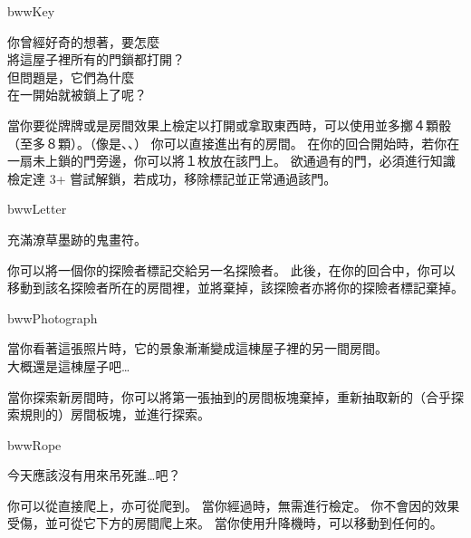 \begin{OmenCard}{bww}{Key}{}
	\begin{CardStory}
		你曾經好奇的想著，要怎麼\\
		將這屋子裡所有的門鎖都打開？\\
		但問題是，它們為什麼\\
		在一開始就被鎖上了呢？
	\end{CardStory}
	\footnotesize
	當你要從牌牌或是房間效果上檢定以打開或拿取東西時，可以使用\ThisName{}並多擲４顆骰（至多８顆）。（像是、、）\smallbreak
	你可以直接進出有的房間。\smallbreak
	在你的回合開始時，若你在一扇未上鎖的門旁邊，你可以將１枚放在該門上。\smallbreak
	欲通過有的門，必須進行知識檢定達 3+ 嘗試解鎖，若成功，移除標記並正常通過該門。
\end{OmenCard}%
\linebreak[0]%
\begin{OmenCard}{bww}{Letter}{}
	\begin{CardStory}
		充滿潦草墨跡的鬼畫符。
	\end{CardStory}
	你可以將一個你的探險者標記交給另一名探險者。\smallbreak
	此後，在你的回合中，你可以移動到該名探險者所在的房間裡，並將\ThisName{}棄掉，該探險者亦將你的探險者標記棄掉。\smallbreak
\end{OmenCard}%
\linebreak[0]%
\begin{OmenCard}{bww}{Photograph}{}
	\begin{CardStory}
		當你看著這張照片時，它的景象漸漸變成這棟屋子裡的另一間房間。\\
		大概還是這棟屋子吧…
	\end{CardStory}
	當你探索新房間時，你可以將第一張抽到的房間板塊棄掉，重新抽取新的（合乎探索規則的）房間板塊，並進行探索。\smallbreak
\end{OmenCard}%
\linebreak[0]%
\begin{OmenCard}{bww}{Rope}{}
	\begin{CardStory}
		今天應該沒有用來吊死誰…吧？
	\end{CardStory}
	你可以從直接爬上，亦可從爬到。\smallbreak
	當你經過時，無需進行檢定。\smallbreak
	你不會因的效果受傷，並可從它下方的房間爬上來。\smallbreak
	當你使用升降機時，可以移動到任何的。\smallbreak
\end{OmenCard}%
\linebreak[0]%
